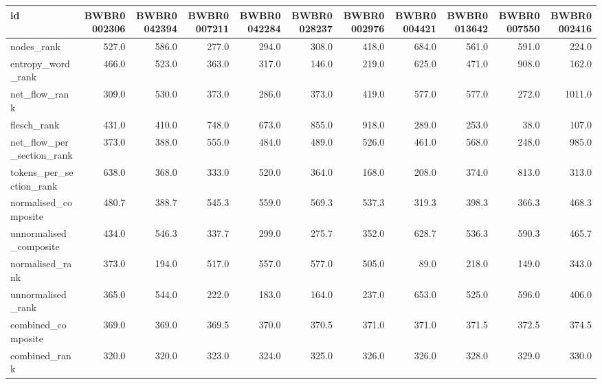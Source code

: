 \begin{tabular}{lrrrrrrrrrr}
\toprule
id & BWBR0002306 & BWBR0042394 & BWBR0007211 & BWBR0042284 & BWBR0028237 & BWBR0002976 & BWBR0004421 & BWBR0013642 & BWBR0007550 & BWBR0002416 \\
\midrule
nodes\_rank & 527.0 & 586.0 & 277.0 & 294.0 & 308.0 & 418.0 & 684.0 & 561.0 & 591.0 & 224.0 \\
\cline{1-11}
entropy\_word\_rank & 466.0 & 523.0 & 363.0 & 317.0 & 146.0 & 219.0 & 625.0 & 471.0 & 908.0 & 162.0 \\
\cline{1-11}
net\_flow\_rank & 309.0 & 530.0 & 373.0 & 286.0 & 373.0 & 419.0 & 577.0 & 577.0 & 272.0 & 1011.0 \\
\cline{1-11}
flesch\_rank & 431.0 & 410.0 & 748.0 & 673.0 & 855.0 & 918.0 & 289.0 & 253.0 & 38.0 & 107.0 \\
\cline{1-11}
net\_flow\_per\_section\_rank & 373.0 & 388.0 & 555.0 & 484.0 & 489.0 & 526.0 & 461.0 & 568.0 & 248.0 & 985.0 \\
\cline{1-11}
tokens\_per\_section\_rank & 638.0 & 368.0 & 333.0 & 520.0 & 364.0 & 168.0 & 208.0 & 374.0 & 813.0 & 313.0 \\
\cline{1-11}
normalised\_composite & 480.7 & 388.7 & 545.3 & 559.0 & 569.3 & 537.3 & 319.3 & 398.3 & 366.3 & 468.3 \\
\cline{1-11}
unnormalised\_composite & 434.0 & 546.3 & 337.7 & 299.0 & 275.7 & 352.0 & 628.7 & 536.3 & 590.3 & 465.7 \\
\cline{1-11}
normalised\_rank & 373.0 & 194.0 & 517.0 & 557.0 & 577.0 & 505.0 & 89.0 & 218.0 & 149.0 & 343.0 \\
\cline{1-11}
unnormalised\_rank & 365.0 & 544.0 & 222.0 & 183.0 & 164.0 & 237.0 & 653.0 & 525.0 & 596.0 & 406.0 \\
\cline{1-11}
combined\_composite & 369.0 & 369.0 & 369.5 & 370.0 & 370.5 & 371.0 & 371.0 & 371.5 & 372.5 & 374.5 \\
\cline{1-11}
combined\_rank & 320.0 & 320.0 & 323.0 & 324.0 & 325.0 & 326.0 & 326.0 & 328.0 & 329.0 & 330.0 \\
\cline{1-11}
\bottomrule
\end{tabular}
